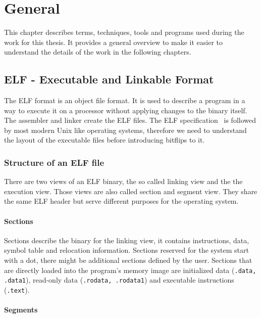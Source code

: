 \chapter{General}\label{sec:general}

This chapter describes terms, techniques, tools and programs used during the
work for this thesis. It provides a general overview to make it easier to
understand the details of the work in the following chapters.

\section{ELF - Executable and Linkable Format}

The ELF format is an object file format. It is used to describe a program in a
way to execute it on a processor without applying changes to the binary itself.
The assembler and linker create the ELF files. The ELF
specification~\cite{elfspec} is followed by most modern Unix like operating
systems, therefore we need to understand the layout of the executable files
before introducing bitflips to it.

\subsection{Structure of an ELF file}

There are two views of an ELF binary, the so called linking view and the the 
execution view. Those views are also called section and segment view. They 
share the same ELF header but serve different purposes for the operating system.

\subsubsection{Sections}

Sections describe the binary for the linking view, it contains instructions,
data, symbol table and relocation information. Sections reserved for the system
start with a dot, there might be additional sections defined by the user.
Sections that are directly loaded into the program's memory image are
initialized data (\texttt{.data, .data1}), read-only data (\texttt{.rodata,
.rodata1}) and executable instructions (\texttt{.text}).

\subsubsection{Segments}

